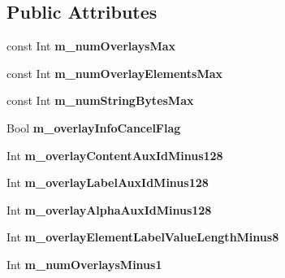 \subsection*{Public Attributes}
\begin{DoxyCompactItemize}
\item 
\mbox{\label{class_s_e_i_overlay_info_a36379b321a84fe6e3c7fb45b3b254887}} 
const Int {\bfseries m\+\_\+num\+Overlays\+Max}
\item 
\mbox{\label{class_s_e_i_overlay_info_a31a8c0de04358f22c09e3c6e646e3ee3}} 
const Int {\bfseries m\+\_\+num\+Overlay\+Elements\+Max}
\item 
\mbox{\label{class_s_e_i_overlay_info_ac4c3b08720c82cd883e459bc6bbe2afe}} 
const Int {\bfseries m\+\_\+num\+String\+Bytes\+Max}
\item 
\mbox{\label{class_s_e_i_overlay_info_ab20c9d98ca577d75478562fcd13fd5d4}} 
Bool {\bfseries m\+\_\+overlay\+Info\+Cancel\+Flag}
\item 
\mbox{\label{class_s_e_i_overlay_info_a599427f46b70914ef0f6a2eac3a2adf3}} 
Int {\bfseries m\+\_\+overlay\+Content\+Aux\+Id\+Minus128}
\item 
\mbox{\label{class_s_e_i_overlay_info_a769cb27b14e3f100b712e7008fee28ab}} 
Int {\bfseries m\+\_\+overlay\+Label\+Aux\+Id\+Minus128}
\item 
\mbox{\label{class_s_e_i_overlay_info_a35ba0844af335af000cecd173b0b4cc1}} 
Int {\bfseries m\+\_\+overlay\+Alpha\+Aux\+Id\+Minus128}
\item 
\mbox{\label{class_s_e_i_overlay_info_aae65a7057684afca46aa97b74939f858}} 
Int {\bfseries m\+\_\+overlay\+Element\+Label\+Value\+Length\+Minus8}
\item 
\mbox{\label{class_s_e_i_overlay_info_a6c29c9c22e5a8c04a2a2c3e84a64ad66}} 
Int {\bfseries m\+\_\+num\+Overlays\+Minus1}
\item 
\mbox{\label{class_s_e_i_overlay_info_a5eecacc734cd97a9d9b513129cb73636}} 

\end{DoxyCompactItemize}
